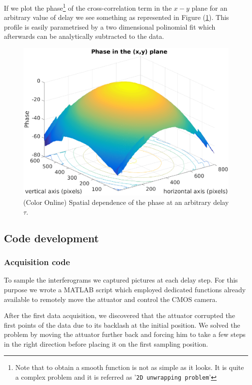 \documentclass[12pt,a4paper,twoside]{article}
\begin{document}
If we plot the phase\footnote{Note that to obtain a smooth function is not as simple as it looks. It is quite a complex problem and it is referred as '\texttt{2D unwrapping problem}'} of the cross-correlation term in the $x-y$ plane for an arbitrary value of delay we see something as represented in Figure (\ref{fig_paraboloid}).
This profile is easily parametrised by a two dimensional polinomial fit which afterwards can be analytically subtracted to the data.

\begin{figure}[hb]
	\centering
	\includegraphics[scale=0.7]{data/phase2D}
	\caption{(Color Online) Spatial dependence of the phase at an arbitrary delay $\tau$.}
	\label{fig_paraboloid}
\end{figure}

\subsection{Code development}
\subsubsection*{Acquisition code}
To sample the interferograms we captured pictures at each delay step.
For this purpose we wrote a MATLAB script which employed dedicated functions already available to remotely move the attuator and control the CMOS camera.

After the first data acquisition, we discovered that the attuator corrupted the first points of the data due to its backlash at the initial position.
We solved the problem by moving the attuator further back and forcing him to take a few steps in the right direction before placing it on the first sampling position.
\end{document}
